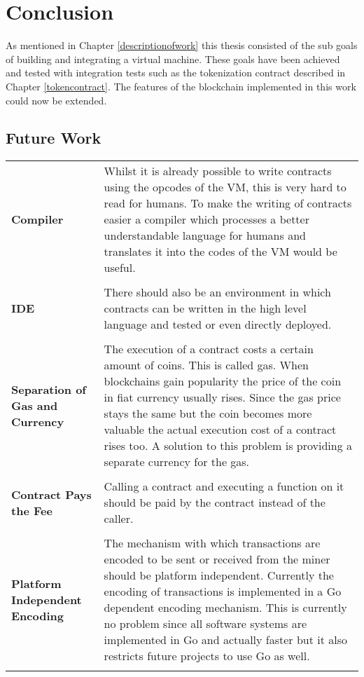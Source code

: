 \chapter{Conclusion}
\label{futureworkandconclusions}
As mentioned in Chapter \ref{descriptionofwork} this thesis consisted of the sub goals of building and integrating a virtual machine. These goals have been achieved and tested with integration tests such as the tokenization contract described in Chapter \ref{tokencontract}. The features of the blockchain implemented in this work could now be extended.

\section{Future Work}
\begin{tabular}[t]{ p{3cm} p{12.5cm}}
\raggedright
\textbf{Compiler} & 
Whilst it is already possible to write contracts using the opcodes of the VM, this is very hard to read for humans. To make the writing of contracts easier a compiler which processes a better understandable language for humans and translates it into the codes of the VM would be useful. \\ \\

\textbf{IDE} & 
There should also be an environment in which contracts can be written in the high level language and tested or even directly deployed. \\ \\

\raggedright
\textbf{Separation of Gas and Currency} & 
The execution of a contract costs a certain amount of coins. This is called gas. When blockchains gain popularity the price of the coin in fiat currency usually rises. Since the gas price stays the same but the coin becomes more valuable the actual execution cost of a contract rises too. A solution to this problem is providing a separate currency for the gas. \\ \\

\raggedright
\textbf{Contract Pays the Fee} & 
Calling a contract and executing a function on it should be paid by the contract instead of the caller. \\ \\

\raggedright
\textbf{Platform Independent Encoding} &
The mechanism with which transactions are encoded to be sent or received from the miner should be platform independent. Currently the encoding of transactions is implemented in a Go dependent encoding mechanism. This is currently no problem since all software systems are implemented in Go and actually faster but it also restricts future projects to use Go as well. \\ \\ 
\end{tabular}